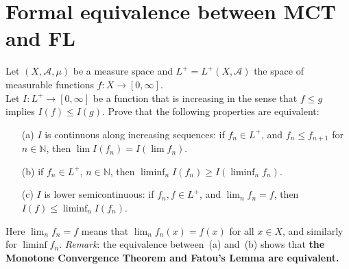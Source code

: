 \documentclass[lang=cn,11pt]{elegantbook}
\begin{document}
\section{Formal equivalence between MCT and FL}
  Let $(X,\mathcal{A},\mu)$ be a measure space and $L^+=L^+(X,\mathcal{A})$ the space of measurable functions $f\colon X\to[0,\infty]$. \\
  Let $I\colon L^+\to[0,\infty]$ be a function that is increasing in the sense that $f\le g$ implies $I(f)\le I(g)$. Prove that the following properties are equivalent:
  \begin{itemize}
  \item[(a)]$I$ is continuous along increasing sequences: if $f_n\in L^+$, and $f_n\le f_{n+1}$ for $n\in\mathbb{N}$, then $\lim I(f_n)=I(\lim f_n)$.
  \item[(b)] if $f_n\in L^+$, $n\in\mathbb{N}$, then $\liminf_nI(f_n)\ge I(\liminf_nf_n)$.
  \item[(c)] $I$ is lower semicontinuous: if $f_n,f\in L^+$, and $\lim_nf_n=f$, then 
    $I(f)\le\liminf_nI(f_n)$.
  \end{itemize}
  Here $\lim_nf_n=f$ means that $\lim_nf_n(x)=f(x)$ for all $x\in X$, and similarly for $\liminf f_n$.
\textit{Remark}: the equivalence between~(a) and~(b) shows that \textbf{the Monotone Convergence Theorem and Fatou's Lemma are equivalent.}
\end{document}
